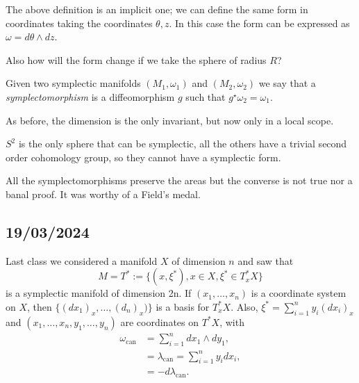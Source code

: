 \documentclass[misc]{subfiles}
\begin{document}
\begin{Exc}
    The above definition is an implicit one; we can define the same form in coordinates taking the coordinates $\theta, z$. In this case the form can be expressed as $\omega= d\theta \wedge dz$.

    Also how will the form change if we take the sphere of radius $R$?
\end{Exc}

\begin{Dfn}
    Given two symplectic manifolds $(M_1,\omega_1)$ and $(M_2,\omega_2)$ we say that a \emph{symplectomorphism} is a diffeomorphism $g$ such that $g^\star\omega_2=\omega_1$.

    As before, the dimension is the only invariant, but now only in a local scope.
\end{Dfn}


\begin{Prp}
    $S^2$ is the only sphere that can be symplectic, all the others have a trivial second order cohomology group, so they cannot have a symplectic form.
\end{Prp}

\begin{Prp}
    All the symplectomorphisms preserve the areas but the converse is not true nor a banal proof. It was worthy of a Field's medal.
\end{Prp}

\subsection*{19/03/2024}

Last class we considered a manifold $X$ of dimension $n$ and saw that
\[
M=T^\ast:=\{(x,\xi^\ast), x\in X, \xi^\ast\in T_x^\ast X\}
\] 
is a symplectic manifold of dimension 2n. If $(x_1,\dots,x_n)$ is a coordinate system on $X$, then $\{(dx_1)_x,\dots,(d_n)_x)\}$ is a basis for $T_x^\ast X$. Also, $\xi^\ast=\sum_{i=1}^n y_i(dx_i)_x$ and $(x_1,\dots,x_n,y_1,\dots,y_n)$ are coordinates on $T^\ast X$, with
\begin{align*}
    \omega_\text{can} &= \sum_{i=1}^n dx_1\wedge dy_1, \\
                      &= \lambda_\text{can} = \sum_{i=1}^n y_i dx_i, \\
                      &= -d\lambda_\text{can}.
\end{align*}

\end{document}
